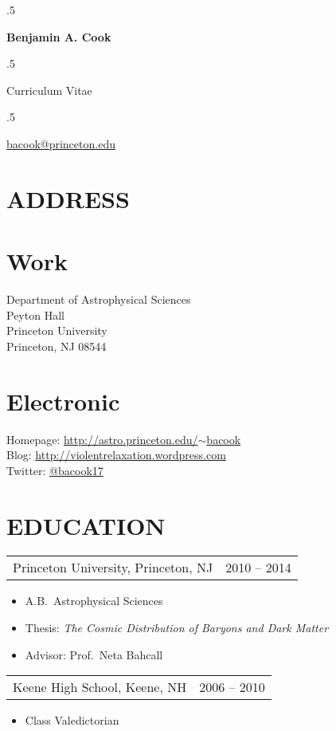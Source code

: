\documentclass[margin]{res}
\newcommand\mancenter[1]{\moveleft.5\hoffset\centerline{#1}}
\begin{document}
  
\mancenter{\huge \bf{Benjamin A. Cook}}
\mancenter{\huge Curriculum Vitae} 
\mancenter{\large \href{mailto:bacook@princeton.edu}{bacook@princeton.edu}}


\begin{resume}                        
 
\section{ADDRESS}
\section{Work}
Department of Astrophysical Sciences\\
Peyton Hall\\
Princeton University\\ 
Princeton, NJ 08544

\section{Electronic}
Homepage: \href{http://astro.princeton.edu/~bacook}{http://astro.princeton.edu/$\sim$bacook}\\
Blog: \href{http://violentrelaxation.wordpress.com}{http://violentrelaxation.wordpress.com}\\
Twitter: \href{https://twitter.com/bacook17}{@bacook17}

\section{EDUCATION} 

\begin{tabular}{@{}p{4in} r@{}}
  Princeton University, Princeton, NJ & 2010 -- 2014
\end{tabular}
\begin{itemize} \itemsep -2pt
\item[] A.B.~Astrophysical Sciences
\item[] Thesis: \textit{The Cosmic Distribution of
  Baryons and Dark Matter}
\item[] Advisor: Prof.~Neta Bahcall
\end{itemize}

\begin{tabular}{@{}p{4in} r@{}}
  Keene High School, Keene, NH & 2006 -- 2010
\end{tabular}
\begin{itemize} \itemsep -2pt
\item[] Class Valedictorian
\end{itemize}


\end{resume}
\end{document}
